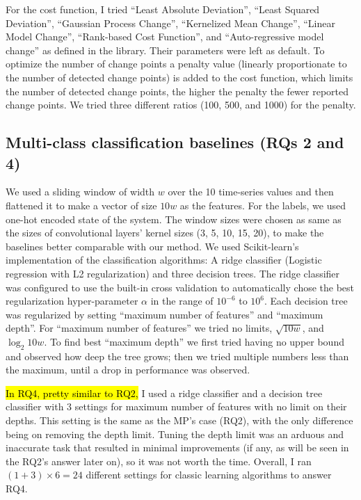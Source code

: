 For the cost function, I tried ``Least Absolute Deviation'', ``Least Squared Deviation'', ``Gaussian Process Change'', ``Kernelized Mean Change'', ``Linear Model Change'', ``Rank-based Cost Function'', and ``Auto-regressive model change'' as defined in the library. Their parameters were left as default.
To optimize the number of change points a penalty value (linearly proportionate to the number of detected change points) is added to the cost function, which limits the number of detected change points, the higher the penalty the fewer reported change points. We tried three different ratios (100, 500, and 1000) for the penalty.

\subsection{Multi-class classification baselines (RQs 2 and 4)}
We used a sliding window of width $w$ over the 10 time-series values and then flattened it to make a vector of size $10w$ as the features. For the labels, we used one-hot encoded state of the system.
The window sizes were chosen as same as the sizes of convolutional layers' kernel sizes (3, 5, 10, 15, 20), to make the baselines better comparable with our method. 
We used Scikit-learn's implementation of the classification algorithms: A ridge classifier (Logistic regression with L2 regularization) and three decision trees. The ridge classifier was configured to use the built-in cross validation to automatically chose the best regularization hyper-parameter $\alpha$ in the range of $10^{-6}$ to $10^6$. Each decision tree was regularized by setting ``maximum number of features'' and ``maximum depth''. For ``maximum number of features'' we tried no limits, $\sqrt{10w}$, and $\log_2{10w}$. To find best ``maximum depth'' we first tried having no upper bound and observed how deep the tree grows; then we tried multiple numbers less than the maximum, until a drop in performance was observed. 

\hl{In RQ4, pretty similar to RQ2,} I used a ridge classifier and a decision tree classifier with 3 settings for maximum number of features with no limit on their depths. This setting is the same as the MP's case (RQ2), with the only difference being on removing the depth limit. Tuning the depth limit was an arduous and inaccurate task that resulted in minimal improvements (if any, as will be seen in the RQ2's answer later on), so it was not worth the time. Overall, I ran $(1+3)\times6=24$ different settings for classic learning algorithms to answer RQ4. 



